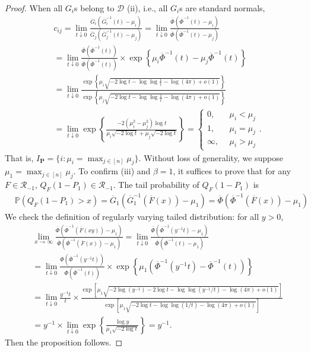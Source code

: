 \documentclass[12pt]{article}
\theoremstyle{plain}
\theoremstyle{plain}
\theoremstyle{definition}
\renewcommand{\Pr}{\mathbb{P}}
\begin{document}
\begin{proof}
When all $G_i$s belong to $\mathscr{D}$ (ii), i.e., all $G_i$s are standard normals,
\begin{align*}
&c_{ij} 
=\lim_{t\downarrow0}\frac{\overline{G}_i\left(\overline{G}_i^{-1}(t)-\mu_i\right)}{\overline{G}_j\left(\overline{G}_j^{-1}(t)-\mu_j\right)}
=\lim_{t\downarrow0}\frac{\overline{\Phi}\left(\overline{\Phi}^{-1}(t)-\mu_i\right)}{\overline{\Phi}\left(\overline{\Phi}^{-1}(t)-\mu_j\right)}\\
&=\lim_{t\downarrow0}\frac{\overline{\Phi}\left(\overline{\Phi}^{-1}(t)\right)}{\overline{\Phi}\left(\overline{\Phi}^{-1}(t)\right)}\times\exp\left\{\mu_i\overline{\Phi}^{-1}(t)-\mu_j\overline{\Phi}^{-1}(t)\right\}\\
&=\lim_{t\downarrow0}\frac{\exp\left\{\mu_i\sqrt{-2\log{t}-\log\log\frac{1}{t}-\log(4\pi)+o(1)}\right\}}{\exp\left\{\mu_j\sqrt{-2\log{t}-\log\log\frac{1}{t}-\log(4\pi)+o(1)}\right\}}\\
&=\lim_{t\downarrow0}\exp\left\{\frac{-2(\mu_i^2-\mu_j^2)\log{t}}
{\mu_i\sqrt{-2\log{t}}+\mu_j\sqrt{-2\log{t}}}\right\}
=\begin{cases}
    0,~~&\mu_i<\mu_j\\
    1,~~&\mu_i=\mu_j\\
    \infty,~~&\mu_i>\mu_j
\end{cases}
.
\end{align*}
That is, $I_{\mathbf{P}}=\{i:\mu_i=\max_{j\in[n]}\mu_j\}$. Without loss of generality, we suppose $\mu_1=\max_{j\in[n]}\mu_j$. To confirm (iii) and $\beta=1$, it suffices to prove that for any $F\in\mathscr{R}_{-1}$, $Q_F(1-P_1)\in\mathscr{R}_{-1}$. The tail probability of $Q_F(1-P_1)$ is
\begin{align*}
&\Pr(Q_F(1-P_1)>x)
=\overline{G}_1\left(\overline{G}_1^{-1}(\overline{F}(x))-\mu_1\right)
=\overline{\Phi}\left(\overline{\Phi}^{-1}(\overline{F}(x))-\mu_1\right)
\end{align*}
We check the definition of regularly varying tailed distribution: for all $y>0$,
\begin{align*}
&\lim_{x\to\infty}\frac{\overline{\Phi}\left(\overline{\Phi}^{-1}(\overline{F}(xy))-\mu_1\right)}{\overline{\Phi}\left(\overline{\Phi}^{-1}(\overline{F}(x))-\mu_1\right)}
=\lim_{t\downarrow0}\frac{\overline{\Phi}\left(\overline{\Phi}^{-1}\left(y^{-1}t\right)-\mu_1\right)}{\overline{\Phi}\left(\overline{\Phi}^{-1}\left(t\right)-\mu_1\right)}\\
&=\lim_{t\downarrow0}\frac{\Phi\left(\overline{\Phi}^{-1}\left(y^{-1}t\right)\right)}{\Phi\left(\overline{\Phi}^{-1}\left(t\right)\right)}\times\exp\left\{\mu_1\left(\overline{\Phi}^{-1}\left(y^{-1}t\right)-\overline{\Phi}^{-1}\left(t\right)\right)\right\}\\
&=\lim_{t\downarrow0}\frac{y^{-1}t}{t}\times\frac{\exp\left[\mu_1\sqrt{-2\log(y^{-1})-2\log{t}-\log\log(y^{-1}/t)-\log(4\pi)+o(1)}\right]}{\exp\left[\mu_1\sqrt{-2\log{t}-\log\log(1/t)-\log(4\pi)+o(1)}\right]}\\
&=y^{-1}\times \lim_{t\downarrow0}\exp\left\{\frac{\log{y}}
{\mu_1\sqrt{-2\log{t}}}\right\}
=y^{-1}.
\end{align*}
Then the proposition follows.
\end{proof}
\end{document}
